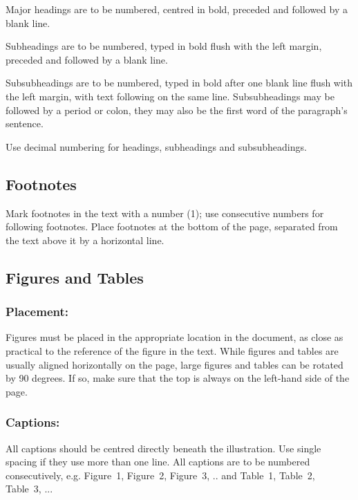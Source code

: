 \documentclass{isprs} %
\begin{document}

Major headings are to be numbered, centred in bold, preceded and followed by a blank line.

Subheadings are to be numbered, typed in bold flush with the left margin, preceded and followed by a blank line. 

Subsubheadings are to be numbered, typed in bold after one blank line flush with the left margin, with text following on the same line. Subsubheadings may be followed by a period or colon, they may also be the first word of the paragraph's sentence.

Use decimal numbering for headings, subheadings and subsubheadings.


\subsection{Footnotes}\label{sec:Footnotes}

Mark footnotes in the text with a number (1); use consecutive numbers for following footnotes. Place footnotes at the bottom of the page, separated from the text above it by a horizontal line.


\subsection{Figures and Tables}\label{sec:Illustrations and Tables}

\subsubsection{Placement:}\label{sec:Placement}

Figures must be placed in the appropriate location in the document, as close as practical to the reference of the figure in the text. While figures and tables are usually aligned horizontally on the page, large figures and tables can be rotated by 90 degrees. If so, make sure that the top is always on the left-hand side of the page.

\subsubsection{Captions:}\label{sec:Captions}

All captions should be centred directly beneath the illustration. Use single spacing if they 
use more than one line. All captions are to be numbered consecutively, 
e.g. Figure~1, Figure~2, Figure~3, ..  and Table~1, Table~2, Table~3, ...
\end{document}
